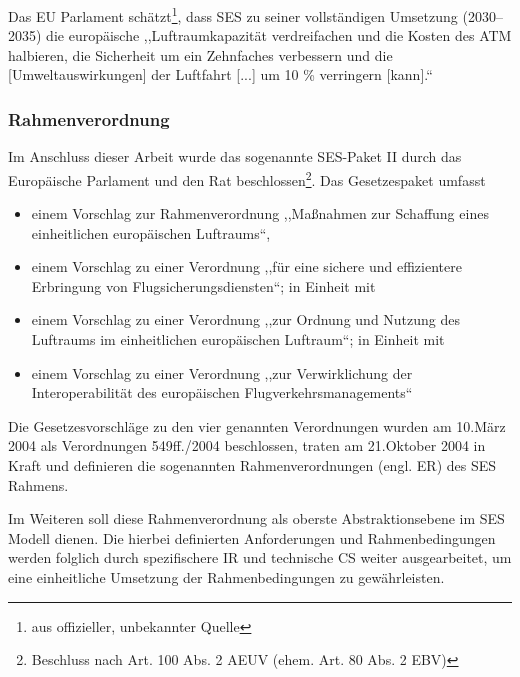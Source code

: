 Das \acs{EU} Parlament schätzt\footnote{aus offizieller, unbekannter Quelle}, dass \ac{SES} zu seiner vollständigen Umsetzung (2030--2035) die europäische ,,Luftraumkapazität verdreifachen und die Kosten des \ac{ATM} halbieren, die Sicherheit um ein Zehnfaches verbessern und die [Umweltauswirkungen] der Luftfahrt [...] um 10 \% verringern [kann].`` 
\cite{eu_parl_ses} 



\pagebreak
\subsubsection{Rahmenverordnung}

Im Anschluss dieser Arbeit wurde das sogenannte \acs{SES}-Paket II durch das Europäische Parlament und den Rat beschlossen\footnote{Beschluss nach Art. 100 Abs. 2 AEUV (ehem. Art. 80 Abs. 2 EBV)}.
Das Gesetzespaket umfasst 

\begin{itemize}
    \item einem Vorschlag zur Rahmenverordnung ,,Maßnahmen zur Schaffung eines einheitlichen europäischen Luftraums``\cite{kom_01_564, kom_01_123},
    \item einem Vorschlag zu einer Verordnung ,,für eine sichere und effizientere Erbringung von Flugsicherungsdiensten``\cite{kom_01_564_1}; in Einheit mit
    \item  einem Vorschlag zu einer Verordnung ,,zur Ordnung und Nutzung des Luftraums im einheitlichen europäischen Luftraum``\cite{kom_01_564_2}; in Einheit mit
    \item  einem Vorschlag zu einer Verordnung ,,zur Verwirklichung der Interoperabilität des europäischen Flugverkehrsmanagements``\cite{kom_01_564_3}
\end{itemize}

Die Gesetzesvorschläge zu den vier genannten Verordnungen wurden am 10.März 2004 als Verordnungen 549ff./2004 beschlossen, traten am 21.Oktober 2004 in Kraft \cite[S.12]{eu_ses_studie} und definieren die sogenannten Rahmenverordnungen (engl. \acf{ER}) des \ac{SES} Rahmens.

Im Weiteren soll diese Rahmenverordnung als oberste Abstraktionsebene im \ac{SES} Modell dienen. 
Die hierbei definierten Anforderungen und Rahmenbedingungen werden folglich durch spezifischere \acf{IR} und technische \acf{CS} weiter ausgearbeitet, um eine einheitliche Umsetzung der Rahmenbedingungen zu gewährleisten.




